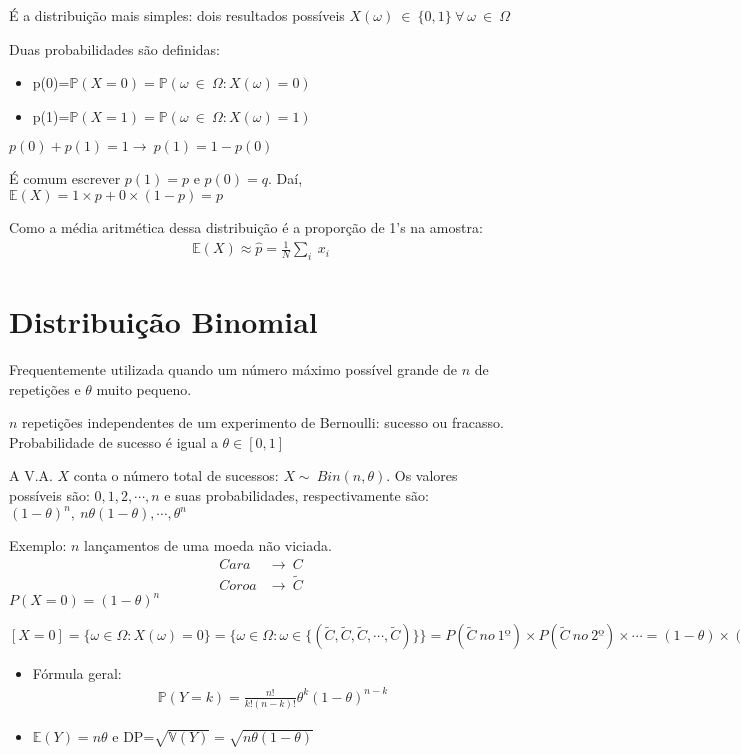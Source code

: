 \documentclass[11pt,a4paper]{article}
\begin{document}
		É a distribuição mais simples: dois resultados possíveis
		$X(\omega)~\in~\lbrace0,1\rbrace~\forall~\omega~\in~\Omega$
		
		Duas probabilidades são definidas:
		\begin{itemize}
			\item p(0)=$\mathbb{P}(X=0)=\mathbb{P}(\omega~\in~\Omega:X(\omega)=0)$
			\item p(1)=$\mathbb{P}(X=1)=\mathbb{P}(\omega~\in~\Omega:X(\omega)=1)$
		\end{itemize}
		
		$p(0)+p(1)=1\rightarrow~p(1)=1-p(0)$
		
		É comum escrever $p(1)=p$ e $p(0)=q$.
		Daí, $\mathbb{E}(X)=1\times p+0\times(1-p)=p$
		
		Como a média aritmética dessa distribuição é a proporção de 1's na amostra:
		\begin{align*}
			\mathbb{E}(X)\approx\hat{p}=\frac{1}{N}\sum_i~x_i
		\end{align*}
		
		\section{Distribuição Binomial}
		
		Frequentemente utilizada quando um número máximo possível grande de $n$ de repetições e $\theta$ muito pequeno.
		
		$n$ repetições independentes de um experimento de Bernoulli: sucesso ou fracasso.
		Probabilidade de sucesso é igual a $\theta\in[0,1]$ 
		
		A V.A. $X$ conta o número total de sucessos: $X\sim~Bin(n,\theta)$.
		Os valores possíveis são: $0,1,2,\cdots,n$ e suas probabilidades, respectivamente são: $(1-\theta)^n,~n\theta(1-\theta),\cdots,\theta^n$
		
		Exemplo: $n$ lançamentos de uma moeda não viciada.
		\begin{align*}
			Cara&\rightarrow~C\\
			Coroa&\rightarrow~\tilde{C}
		\end{align*}
		$P(X=0) = (1-\theta)^{n}$
			
		$[X=0]=\lbrace\omega \in \Omega:X(\omega)=0\rbrace=\lbrace\omega \in \Omega: \omega \in \lbrace(\tilde{C},\tilde{C},\tilde{C},\cdots,\tilde{C})\rbrace\rbrace=P(\tilde{C}~no~1º)\times P(\tilde{C}~no~2º)\times \cdots = (1-\theta)\times(1-\theta)\cdots = (1-\theta)^{n}$
		
		\begin{itemize}
			\item Fórmula geral:
			\begin{align*}
				\mathbb{P}(Y=k)=\frac{n!}{k!(n-k)!}\theta^k(1-\theta)^{n-k}
			\end{align*}
			\item $\mathbb{E}(Y)=n\theta$ e DP=$\sqrt{\mathbb{V}(Y)}=\sqrt{n\theta(1-\theta)}$
		\end{itemize}
		
\end{document}
